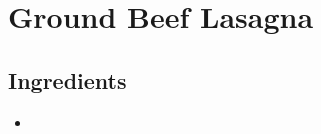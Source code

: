 \thispagestyle{fancy}
\section{Ground Beef Lasagna}
\AddToShipoutPicture*{\Lasagna}

\subsection*{Ingredients}
\begin{multicols}{3}
	\begin{itemize}
		\item 
	\end{itemize}
\end{multicols}